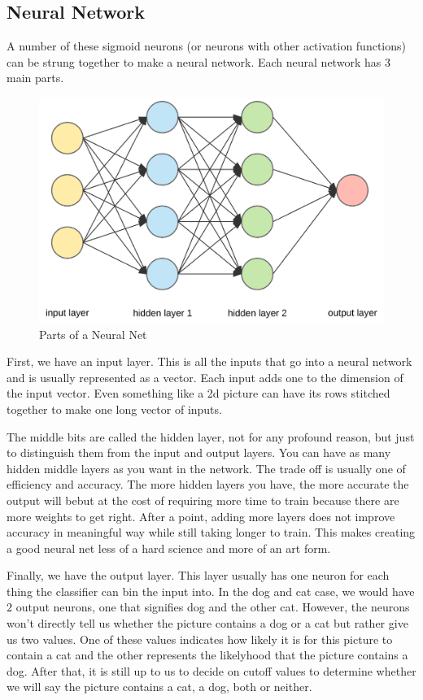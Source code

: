 \subsection{Neural Network}

A number of these sigmoid neurons (or neurons with other activation functions) can be strung together to make a neural network.
Each neural network has 3 main parts.

\begin{figure}[H]
  \centering
  \includegraphics[width=120mm]{figures/neuralNet1.png}
  \caption{Parts of a Neural Net}
  \label{neuralNet2}
\end{figure}

First, we have an input layer.
This is all the inputs that go into a neural network and is usually represented as a vector.
Each input adds one to the dimension of the input vector.
Even something like a 2d picture can have its rows stitched together to make one long vector of inputs.

The middle bits are called the hidden layer, not for any profound reason, but just to distinguish them from the input and output layers.
You can have as many hidden middle layers as you want in the network.
The trade off is usually one of efficiency and accuracy.
The more hidden layers you have, the more accurate the output will bebut at the cost of requiring more time to train because there are more weights to get right.
After a point, adding more layers does not improve accuracy in meaningful way while still taking longer to train.
This makes creating a good neural net less of a hard science and more of an art form.

Finally, we have the output layer.
This layer usually has one neuron for each thing the classifier can bin the input into.
In the dog and cat case, we would have $2$ output neurons, one that signifies dog and the other cat.
However, the neurons won't directly tell us whether the picture contains a dog or a cat but rather give us two values.
One of these values indicates how likely it is for this picture to contain a cat and the other represents the likelyhood that the picture contains a dog.
After that, it is still up to us to decide on cutoff values to determine whether we will say the picture contains a cat, a dog, both or neither.
